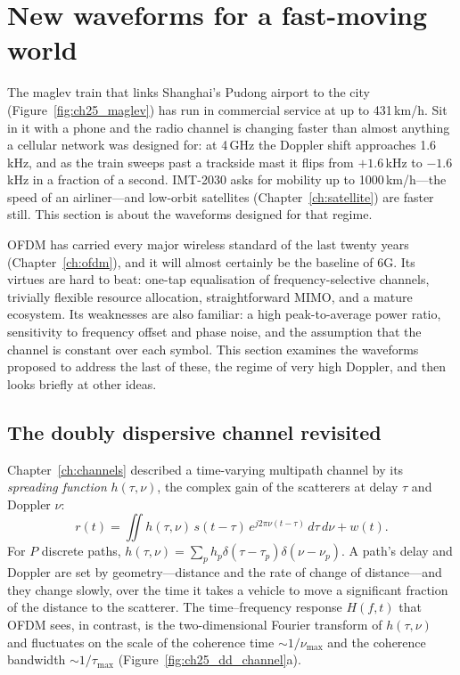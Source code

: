 \section{New waveforms for a fast-moving world}
\label{sec:ch25:waveforms}

The maglev train that links Shanghai's Pudong airport to the city (Figure~\ref{fig:ch25_maglev}) has
run in commercial service at up to 431\,km/h. Sit in it with a phone and the radio channel is
changing faster than almost anything a cellular network was designed for: at 4\,GHz the Doppler
shift approaches 1.6\,kHz, and as the train sweeps past a trackside mast it flips from $+1.6$\,kHz to
$-1.6$\,kHz in a fraction of a second. IMT-2030 asks for mobility up to 1000\,km/h---the speed of an
airliner---and low-orbit satellites (Chapter~\ref{ch:satellite}) are faster still. This section is
about the waveforms designed for that regime.

OFDM has carried every major wireless standard of the last twenty years (Chapter~\ref{ch:ofdm}), and
it will almost certainly be the baseline of 6G. Its virtues are hard to beat: one-tap equalisation of
frequency-selective channels, trivially flexible resource allocation, straightforward MIMO, and a
mature ecosystem. Its weaknesses are also familiar: a high peak-to-average power ratio, sensitivity to
frequency offset and phase noise, and the assumption that the channel is constant over each symbol.
This section examines the waveforms proposed to address the last of these, the regime of very high
Doppler, and then looks briefly at other ideas.


\subsection{The doubly dispersive channel revisited}

Chapter~\ref{ch:channels} described a time-varying multipath channel by its \emph{spreading
function} $h(\tau,\nu)$, the complex gain of the scatterers at delay $\tau$ and Doppler $\nu$:
\begin{equation}
r(t)=\iint h(\tau,\nu)\,s(t-\tau)\,e^{j2\pi\nu(t-\tau)}\,d\tau\,d\nu+w(t).
\label{eq:ch25:spreading}
\end{equation}
For $P$ discrete paths, $h(\tau,\nu)=\sum_ph_p\delta(\tau-\tau_p)\delta(\nu-\nu_p)$. A path's delay
and Doppler are set by geometry---distance and the rate of change of distance---and they change
slowly, over the time it takes a vehicle to move a significant fraction of the distance to the
scatterer. The time--frequency response $H(f,t)$ that OFDM sees, in contrast, is the two-dimensional
Fourier transform of $h(\tau,\nu)$ and fluctuates on the scale of the coherence time $\sim1/\nu_{\max}$
and the coherence bandwidth $\sim1/\tau_{\max}$ (Figure~\ref{fig:ch25_dd_channel}a).

